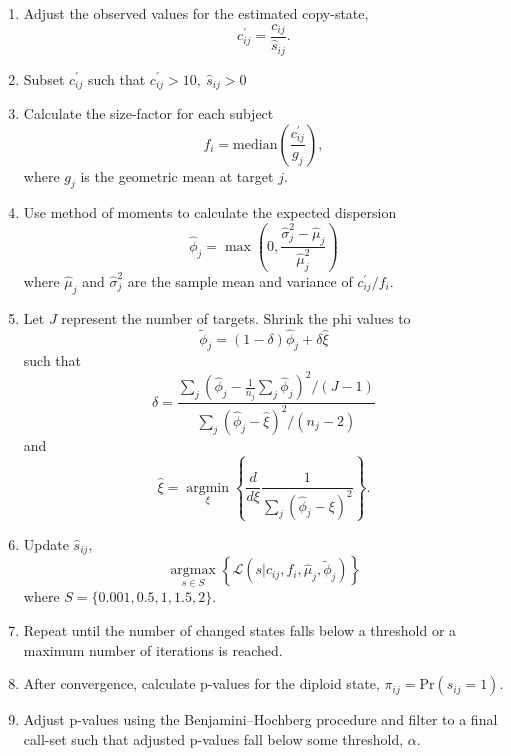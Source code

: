 \documentclass{bmcart}\usepackage[]{graphicx}\usepackage[]{color}
\begin{document}
\begin{enumerate}
  \item Adjust the observed values for the estimated copy-state,
  \begin{equation}
  c_{ij}^{\prime} = \frac{c_{ij}}{\hat{s}_{ij}}.
  \end{equation}
  \item Subset $c_{ij}^{\prime}$ such that $c_{ij}^{\prime} > 10, ~ \hat{s}_{ij} > 0$
  \item Calculate the size-factor for each subject
  \begin{equation}
  f_i = \text{median}\left(\frac{c_{ij}^{\prime}}{g_j}\right),
  \end{equation}
  where $g_j$ is the geometric mean at target $j$.
  \item Use method of moments to calculate the expected dispersion
  \begin{equation}
  \hat\phi_j = \max\left(0, \frac{\hat\sigma_j^2 - \hat{\mu}_j}{\hat{\mu}_j^2}\right)
  \end{equation}
  where $\hat{\mu}_j$ and $\hat{\sigma}_j^2$ are the sample mean and variance of $c_{ij}^{\prime}/f_i$.
  \item Let $J$ represent the number of targets. Shrink the phi values to
  \begin{equation}
  \tilde\phi_j = (1 - \delta)\hat\phi_j + \delta\hat{\xi}
  \end{equation}
  such that
  \begin{equation}
  \delta = \frac{\sum\limits_j\left(\hat\phi_j - \frac{1}{n_j}\sum\limits_j \hat\phi_j\right)^2/(J - 1)}
  {\sum\limits_j\left(\hat\phi_j - \hat{\xi}\right)^2/(n_j - 2)}
  \end{equation}
  and
  \begin{equation}
  \hat{\xi} = \mathop{\text{argmin}}\limits_{\xi}\left\{
  \frac{d}{d\xi}\frac{1}{\sum\limits_j \left(\hat\phi_j - \xi\right)^2}
  \right\}.
  \end{equation}
  \item Update $\hat{s}_{ij}$,
  \begin{equation}
  \mathop{\text{argmax}}\limits_{s \in S}\left\{
  \mathcal{L}(s \rvert c_{ij},f_i,\hat\mu_j,\tilde\phi_j)
  \right\}
  \end{equation}
  where $S = \{0.001, 0.5, 1, 1.5, 2\}$.
  \item Repeat until the number of changed states falls below a threshold or a maximum number of iterations is reached.
  \item After convergence, calculate p-values for the diploid state, $\pi_{ij} = \text{Pr}(s_{ij} = 1)$.
  \item Adjust p-values using the Benjamini–Hochberg procedure \cite{benjamini:1995aa} and filter to a final call-set such that adjusted p-values fall below some threshold, $\alpha$.
\end{enumerate}
\end{document}
